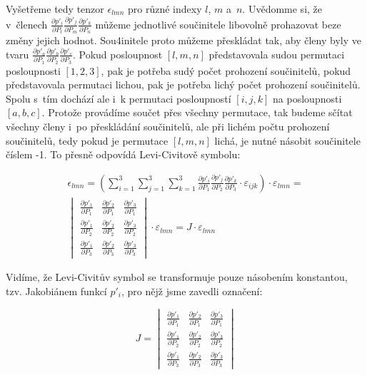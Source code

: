 Vyšetřeme tedy tenzor \(\epsilon_{lmn}\) pro různé indexy \(l\), \(m\) a~\(n\). Uvědomme si, že v~členech \(\frac{\partial p'_i}{\partial P_l} \frac{\partial p'_j}{\partial P_m} \frac{\partial p'_k}{\partial P_n}\) můžeme jednotlivé součinitele libovolně prohazovat beze změny jejich hodnot. Sou4initele proto můžeme přeskládat tak, aby členy byly ve tvaru \(\frac{\partial p'_a}{\partial P_1} \frac{\partial p'_b}{\partial P_2} \frac{\partial p'_c}{\partial P_3}\). Pokud posloupnost \([l, m, n]\) představovala sudou permutaci posloupnosti \([1, 2, 3]\), pak je potřeba sudý počet prohození součinitelů, pokud představovala permutaci lichou, pak je potřeba lichý počet prohození součinitelů. Spolu s~tím dochází ale i~k permutaci posloupností \([i, j, k]\) na posloupnosti \([a, b, c]\). Protože provádíme součet přes všechny permutace, tak budeme sčítat všechny členy i~po přeskládání součinitelů, ale při lichém počtu prohození součinitelů, tedy pokud je permutace \([l, m, n]\) lichá, je nutné násobit součinitele číslem -1. To přesně odpovídá Levi-Civitově symbolu:

\begin{equation}
\begin{split}
\epsilon_{lmn} = \left(\sum_{i=1}^3 \sum_{j=1}^3 \sum_{k=1}^3 \frac{\partial p'_i}{\partial P_1} \frac{\partial p'_j}{\partial P_2} \frac{\partial p'_k}{\partial P_3} \cdot \varepsilon_{ijk} \right) \cdot \varepsilon_{lmn} = \\
\begin{vmatrix}
  \frac{\partial p'_1}{\partial P_1} & \frac{\partial p'_2}{\partial P_1} & \frac{\partial p'_3}{\partial P_1} \\
  \frac{\partial p'_1}{\partial P_2} & \frac{\partial p'_2}{\partial P_2} & \frac{\partial p'_3}{\partial P_2} \\
  \frac{\partial p'_1}{\partial P_3} & \frac{\partial p'_2}{\partial P_3} & \frac{\partial p'_3}{\partial P_3}
\end{vmatrix}
\cdot \varepsilon_{lmn} = J \cdot \varepsilon_{lmn}
\end{split}
\end{equation}

Vidíme, že Levi-Civitův symbol se transformuje pouze násobením konstantou, tzv. Jakobiánem funkcí \(p'_i\), pro nějž jsme zavedli označení:

\begin{equation}
J = 
\begin{vmatrix}
  \frac{\partial p'_1}{\partial P_1} & \frac{\partial p'_2}{\partial P_1} & \frac{\partial p'_3}{\partial P_1} \\
  \frac{\partial p'_1}{\partial P_2} & \frac{\partial p'_2}{\partial P_2} & \frac{\partial p'_3}{\partial P_2} \\
  \frac{\partial p'_1}{\partial P_3} & \frac{\partial p'_2}{\partial P_3} & \frac{\partial p'_3}{\partial P_3}
\end{vmatrix}
\end{equation}

